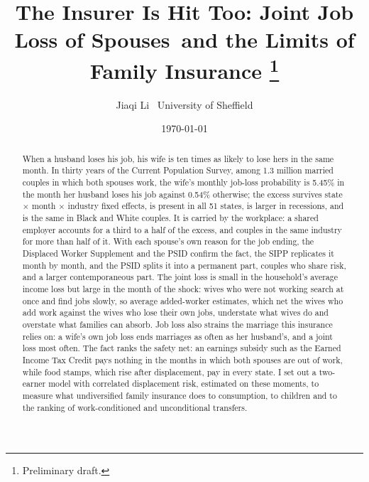 \documentclass[11pt]{article}
\begin{document}
\title{The Insurer Is Hit Too: Joint Job Loss of Spouses\ and the Limits of Family Insurance
\thanks{\footnotesize Preliminary draft.}}
\author{Jiaqi Li \ University of Sheffield}
\date{\today}
\maketitle

\begin{abstract}
\noindent When a husband loses his job, his wife is ten times as likely to lose hers in the same month. In thirty years
of the Current Population Survey, among 1.3 million married couples in which both spouses work, the wife's monthly
job-loss probability is 5.45\% in the month her husband loses his job against 0.54\% otherwise; the excess survives state
$\times$ month $\times$ industry fixed effects, is present in all 51 states, is larger in recessions, and is the same in Black and White couples. It is carried by the workplace: a shared employer accounts for a third to a half of the excess, and couples in the same industry for more than half of it. With each spouse's own reason for the
job ending, the Displaced Worker Supplement and the PSID confirm the fact, the SIPP replicates it month by month, and the PSID
splits it into a permanent part, couples who share risk, and a larger
contemporaneous part. The joint loss is small in the household's average income loss but large in the month of the
shock: wives who were not working search at once and find jobs slowly, so average added-worker estimates, which net
the wives who add work against the wives who lose their own jobs, understate what wives do and overstate what families
can absorb. Job loss also strains the marriage this insurance relies on: a wife's own job loss ends marriages as
often as her husband's, and a joint loss most often. The fact ranks the safety net: an earnings subsidy such as the Earned Income Tax Credit pays nothing in the
months in which both spouses are out of work, while food stamps, which rise after displacement, pay in every state. I set out a
two-earner model with correlated displacement risk, estimated on these moments, to measure what undiversified family
insurance does to consumption, to children and to the ranking of work-conditioned and unconditional transfers.
\end{abstract}

\clearpage













\clearpage
\appendix




\end{document}
